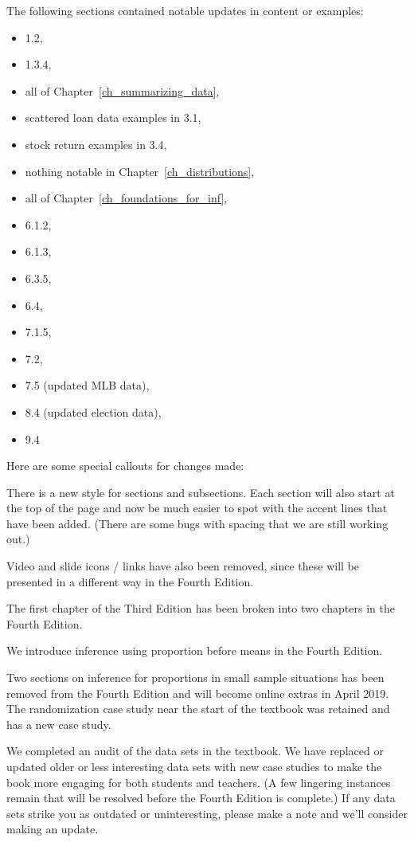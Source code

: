 \noindent%
The following sections contained notable updates
in content or examples:
\begin{itemize}
\item 1.2,
\item 1.3.4,
\item all of Chapter~\ref{ch_summarizing_data},
\item scattered loan data examples in 3.1,
\item stock return examples in 3.4,
\item nothing notable in Chapter~\ref{ch_distributions},
\item all of Chapter~\ref{ch_foundations_for_inf},
\item 6.1.2,
\item 6.1.3,
\item 6.3.5,
\item 6.4,
\item 7.1.5,
\item 7.2,
\item 7.5 (updated MLB data),
\item 8.4 (updated election data),
\item 9.4
\end{itemize}


\noindent%
Here are some special callouts for changes made:
\begin{description}
\item[Stylistic.]
    There is a new style for sections and subsections.
    Each section will also start at the top of the
    page and now be much easier to spot with the accent
    lines that have been added.
    (There are some bugs with spacing that we are still
    working out.)
    
    Video and slide icons / links have also been removed,
    since these will be presented in a different way
    in the Fourth Edition.
\item[Graphics and statistical summaries to their own chapter.]
    The first chapter of the Third Edition has been
    broken into two chapters in the Fourth Edition.
\item[Inference: proportions before means.]
    We introduce inference using proportion before means
    in the Fourth Edition.
\item[Simulation and randomization.]
    Two sections on inference for proportions
    in small sample situations has been removed from
    the Fourth Edition and will become online extras
    in April 2019.
    The randomization case study near the start of the
    textbook was retained and has a new case study.
\item[Lots of new examples.]
    We completed an audit of the data sets in the textbook.
    We have replaced or updated older or less interesting
    data sets with new case studies to make the book more
    engaging for both students and teachers.
    (A few lingering instances remain that will be resolved
    before the Fourth Edition is complete.)
    If any data sets strike you as outdated or uninteresting,
    please make a note and we'll consider making an update.
\item
    
\end{description}


